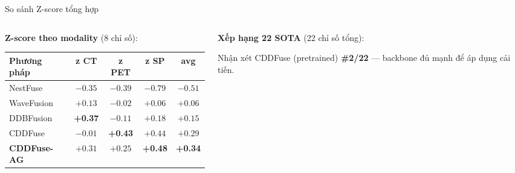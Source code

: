 \documentclass[t, aspectratio=169]{beamer}
\begin{document}
\begin{frame}{So sánh Z-score tổng hợp}
    \begin{columns}[T]
        \begin{column}{0.50\textwidth}
            \small\textbf{Z-score theo modality} (8 chỉ số):
            \vspace{0.2em}
            \footnotesize
            \begin{tabular}{lcccc}
                \toprule
                \textbf{Phương pháp} & \textbf{z CT} & \textbf{z PET} & \textbf{z SP} & \textbf{avg} \\
                \midrule
                NestFuse   & $-0.35$ & $-0.39$ & $-0.79$ & $-0.51$ \\
                WaveFusion & $+0.13$ & $-0.02$ & $+0.06$ & $+0.06$ \\
                DDBFusion  & \textbf{+0.37} & $-0.11$ & $+0.18$ & $+0.15$ \\
                CDDFuse    & $-0.01$ & \textbf{+0.43} & $+0.44$ & $+0.29$ \\
                \midrule
                \rowcolor{red!12}
                \textbf{CDDFuse-AG} & $+0.31$ & $+0.25$ & \textbf{+0.48} & \textbf{+0.34} \\
                \bottomrule
            \end{tabular}
        \end{column}
        \begin{column}{0.46\textwidth}
            \small\textbf{Xếp hạng 22 SOTA} (22 chỉ số tổng):
            \vspace{0.2em}
            \vspace{0.3em}
            \begin{block}{\small Nhận xét}
                \small CDDFuse (pretrained) \textbf{\#2/22} --- backbone đủ mạnh để áp dụng cải tiến.
            \end{block}
        \end{column}
    \end{columns}
\end{frame}
\end{document}
